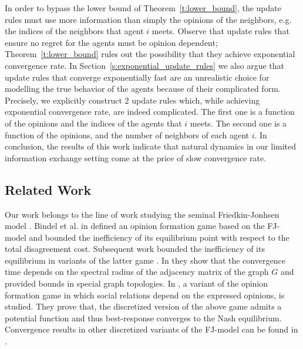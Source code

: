 In order to bypass the lower bound of Theorem~\ref{t:lower_bound},
the update rules must use more information than simply the opinions
of the neighbors, e.g. the indices of the neighbors that agent $i$ meets.
Observe that update rules that ensure no regret for the agents must be opinion
dependent; Theorem~\ref{t:lower_bound} rules out the possibility
that they achieve exponential convergence rate.
In Section~\ref{s:exponential_update_rules} we also argue that
update rules that converge exponentially fast
are an unrealistic choice for modelling the true behavior of
the agents because of their complicated form.
Precisely, we explicitly construct $2$ update rules which, while
achieving exponential convergence rate, are indeed complicated.
The first one is a function of the opinions and the indices of
the agents that $i$ meets. The second one is a function of
the opinions, and the number of neighbors of each agent $i$.
In conclusion, the results of this work indicate that
natural dynamics in our limited information exchange setting
come at the price of slow convergence rate.







\subsection{Related Work}
Our work belongs to the line of work studying the seminal Friedkin-Jonhsen
model \cite{FJ90}. Bindel et al. in \cite{BKO11} defined an opinion
formation game based on the FJ-model and bounded the inefficiency
of its equilibrium point with respect to the total disagreement cost.
Subsequent work bounded the inefficiency of its equilibrium in variants
of the latter game \cite{BGM13, EFHS17, CKO13, BFM16}.
In \cite{GS14} they show that the convergence time depends on
the spectral radius of the adjacency matrix of the graph $G$
and provided bounds in special graph topologies.
In \cite{BFM16}, a variant of the opinion formation game in which social
relations depend on the expressed opinions, is studied.
They prove that, the discretized version of the above game admits
a potential function and thus best-response converges to the
Nash equilibrium. Convergence results in other discretized variants of
the FJ-model can be found in \cite{YOASS13, FGV16}.


